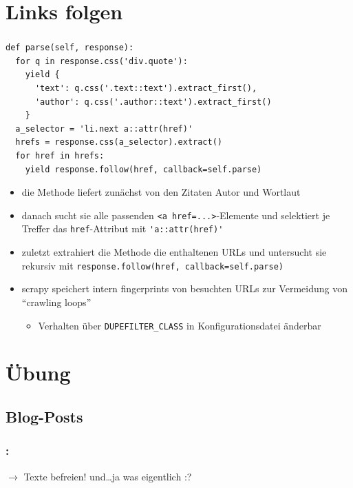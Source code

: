 \documentclass{beamer}
\begin{document}
\section{Links folgen}
\begin{frame}
	\frametitle{\insertsection{}}
	\begin{lstlisting}
def parse(self, response):
  for q in response.css('div.quote'):
    yield {
      'text': q.css('.text::text').extract_first(),
      'author': q.css('.author::text').extract_first()
    }
  a_selector = 'li.next a::attr(href)'
  hrefs = response.css(a_selector).extract()  
  for href in hrefs:    
    yield response.follow(href, callback=self.parse)
	\end{lstlisting}
	\begin{itemize}
		\item die Methode liefert zunächst von den Zitaten Autor und Wortlaut
		\item danach sucht sie alle passenden \lstinline|<a href=...>|-Elemente und selektiert je Treffer das \lstinline|href|-Attribut mit \lstinline|'a::attr(href)'| 
		
		\framebreak
		
		\item zuletzt extrahiert die Methode die enthaltenen URLs und untersucht sie rekursiv mit \lstinline|response.follow(href, callback=self.parse)| 
		\item scrapy speichert intern fingerprints von besuchten URLs zur Vermeidung von ``crawling loops'' \begin{itemize}
			\item Verhalten über \lstinline|DUPEFILTER_CLASS| in Konfigurationsdatei änderbar
		\end{itemize}
	\end{itemize}
\end{frame}


\section{Übung}



\subsection{Blog-Posts}
\begin{frame}
	\frametitle{\insertsection{}: \insertsubsection{}}	
	$\rightarrow$ Texte befreien! und\ldots ja was eigentlich :?
\end{frame}
\end{document}
